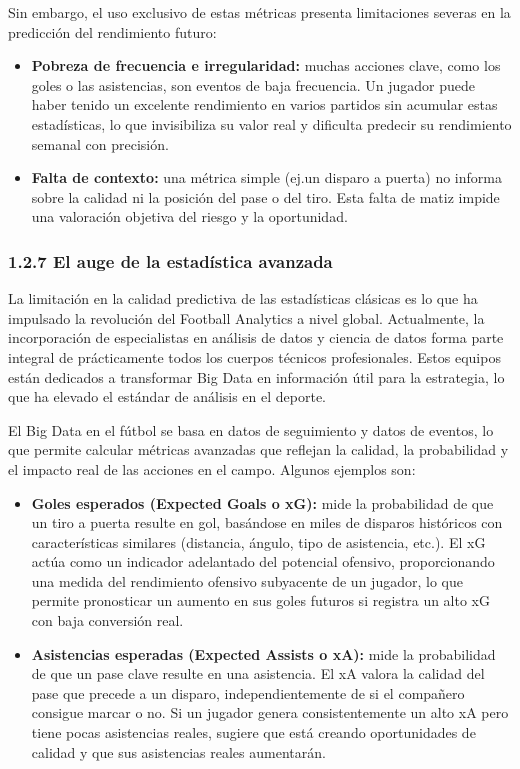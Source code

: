 Sin embargo, el uso exclusivo de estas métricas presenta limitaciones severas en la predicción del 
rendimiento futuro:

\begin{itemize}
\item \textbf{Pobreza de frecuencia e irregularidad:} muchas acciones clave, como los goles o las 
asistencias, son eventos de baja frecuencia.
Un jugador puede haber tenido un excelente rendimiento en varios partidos sin acumular estas 
estadísticas, lo que invisibiliza su valor real y dificulta predecir su rendimiento semanal con 
precisión.
\item \textbf{Falta de contexto:} una métrica simple (ej.\@ un disparo a puerta) no informa sobre la 
calidad ni la posición del pase o del tiro.
Esta falta de matiz impide una valoración objetiva del riesgo y la oportunidad.
\end{itemize}

\subsubsection{1.2.7 El auge de la estadística avanzada}

La limitación en la calidad predictiva de las estadísticas clásicas es lo que ha impulsado la 
revolución del Football Analytics a nivel global.
Actualmente, la incorporación de especialistas en análisis de datos y ciencia de datos forma parte 
integral de prácticamente todos los cuerpos técnicos profesionales.
Estos equipos están dedicados a transformar Big Data en información útil para la estrategia, lo que 
ha elevado el estándar de análisis en el deporte.

El Big Data en el fútbol se basa en datos de seguimiento y datos de eventos, lo que permite calcular 
métricas avanzadas que reflejan la calidad, la probabilidad y el impacto real de las acciones en el campo.
Algunos ejemplos son:

\begin{itemize}
\item \textbf{Goles esperados (Expected Goals o xG):} mide la probabilidad de que un tiro a puerta 
resulte en gol, basándose en miles de disparos históricos con características similares (distancia, 
ángulo, tipo de asistencia, etc.).
El xG actúa como un indicador adelantado del potencial ofensivo, proporcionando una medida del 
rendimiento ofensivo subyacente de un jugador, lo que permite pronosticar un aumento en sus goles 
futuros si registra un alto xG con baja conversión real.
\item \textbf{Asistencias esperadas (Expected Assists o xA):} mide la probabilidad de que un pase 
clave resulte en una asistencia.
El xA valora la calidad del pase que precede a un disparo, independientemente de si el compañero 
consigue marcar o no.
Si un jugador genera consistentemente un alto xA pero tiene pocas asistencias reales, sugiere que 
está creando oportunidades de calidad y que sus asistencias reales aumentarán.
\end{itemize}

